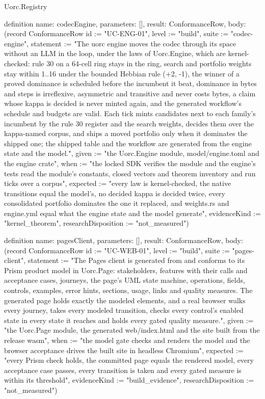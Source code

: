 \begin{lexlean}{Uorc.Registry}
\begin{semanticmodule}
definition{
  name: codecEngine,
  parameters: [],
  result: ConformanceRow,
  body: (record ConformanceRow {id := "UC-ENG-01", level := "build", suite := "codec-engine", statement := "The uorc engine moves the codec through its space without an LLM in the loop, under the laws of Uorc.Engine, which are kernel-checked: rule 30 on a 64-cell ring stays in the ring, search and portfolio weights stay within 1..16 under the bounded Hebbian rule (+2, -1), the winner of a proved dominance is scheduled before the incumbent it beat, dominance in bytes and steps is irreflexive, asymmetric and transitive and never costs bytes, a claim whose kappa is decided is never minted again, and the generated workflow's schedule and budgets are valid. Each tick mints candidates next to each family's incumbent by the rule 30 register and the search weights, decides them over the kappa-named corpus, and ships a moved portfolio only when it dominates the shipped one; the shipped table and the workflow are generated from the engine state and the model.", given := "the Uorc.Engine module, model/engine.toml and the engine crate", when := "the locked SDK verifies the module and the engine's tests read the module's constants, closed vectors and theorem inventory and run ticks over a corpus", expected := "every law is kernel-checked, the native transitions equal the model's, no decided kappa is decided twice, every consolidated portfolio dominates the one it replaced, and weights.rs and engine.yml equal what the engine state and the model generate", evidenceKind := "kernel_theorem", researchDisposition := "not_measured"})
}

definition{
  name: pagesClient,
  parameters: [],
  result: ConformanceRow,
  body: (record ConformanceRow {id := "UC-WEB-01", level := "build", suite := "pages-client", statement := "The Pages client is generated from and conforms to its Prism product model in Uorc.Page: stakeholders, features with their calls and acceptance cases, journeys, the page's UML state machine, operations, fields, controls, examples, error hints, sections, usage, links and quality measures. The generated page holds exactly the modeled elements, and a real browser walks every journey, takes every modeled transition, checks every control's enabled state in every state it reaches and holds every gated quality measure.", given := "the Uorc.Page module, the generated web/index.html and the site built from the release wasm", when := "the model gate checks and renders the model and the browser acceptance drives the built site in headless Chromium", expected := "every Prism check holds, the committed page equals the rendered model, every acceptance case passes, every transition is taken and every gated measure is within its threshold", evidenceKind := "build_evidence", researchDisposition := "not_measured"})
}


\end{semanticmodule}
\end{lexlean}
